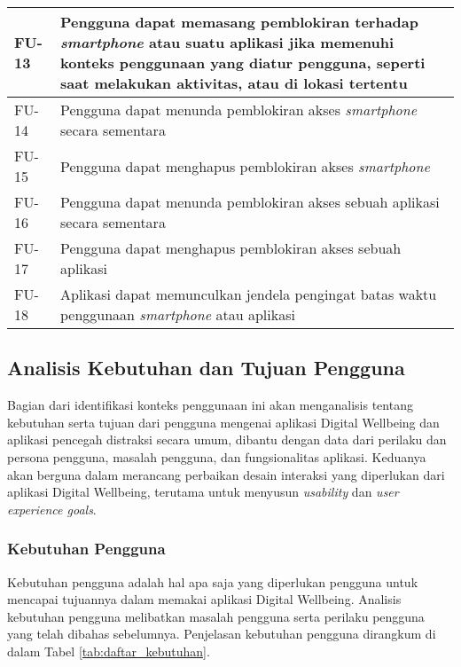 \begin{footnotesize}
\begin{longtable}[c]{|W{c}{0.07\textwidth}|>{\ccnormspacing}m{0.86\textwidth}|}
  FU-13  &  Pengguna dapat memasang pemblokiran terhadap \textit{smartphone} atau suatu aplikasi jika memenuhi konteks penggunaan yang diatur pengguna, seperti saat melakukan aktivitas, atau di lokasi tertentu \\ \hline
  FU-14  &  Pengguna dapat menunda pemblokiran akses \textit{smartphone} secara sementara \\ \hline
  FU-15  &  Pengguna dapat menghapus pemblokiran akses \textit{smartphone}\\ \hline
  FU-16  &  Pengguna dapat menunda pemblokiran akses sebuah aplikasi secara sementara \\ \hline
  FU-17  &  Pengguna dapat menghapus pemblokiran akses sebuah aplikasi \\ \hline
  FU-18  &  Aplikasi dapat memunculkan jendela pengingat batas waktu penggunaan \textit{smartphone} atau aplikasi \\ \hline
  
  
\end{longtable}
\end{footnotesize}
\justifying
\FloatBarrier

\subsection{Analisis Kebutuhan dan Tujuan Pengguna}
\label{subsec:analisis_kebutuhan_tujuan}

Bagian dari identifikasi konteks penggunaan ini akan menganalisis tentang kebutuhan serta tujuan dari pengguna mengenai aplikasi Digital Wellbeing dan aplikasi pencegah distraksi secara umum, dibantu dengan data dari perilaku dan persona pengguna, masalah pengguna, dan fungsionalitas aplikasi. Keduanya akan berguna dalam merancang perbaikan desain interaksi yang diperlukan dari aplikasi Digital Wellbeing, terutama untuk menyusun \textit{usability} dan \textit{user experience goals}.

\subsubsection{Kebutuhan Pengguna}
\label{subsubsec:kebutuhan_pengguna}

Kebutuhan pengguna adalah hal apa saja yang diperlukan pengguna untuk mencapai tujuannya dalam memakai aplikasi Digital Wellbeing. Analisis kebutuhan pengguna melibatkan masalah pengguna serta perilaku pengguna yang telah dibahas sebelumnya. Penjelasan kebutuhan pengguna dirangkum di dalam Tabel \ref{tab:daftar_kebutuhan}.

